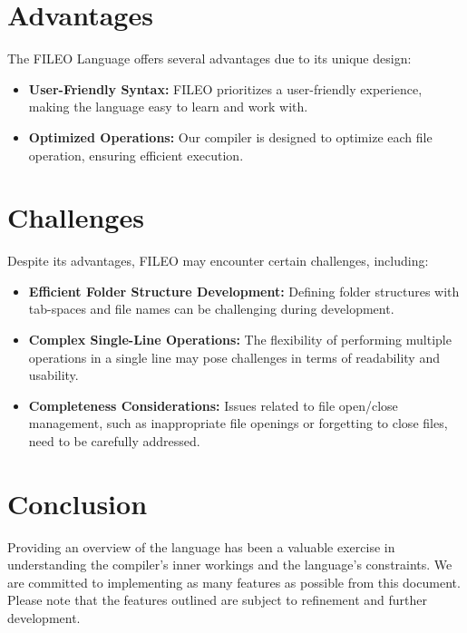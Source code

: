 \documentclass{article}
\begin{document}
\section{Advantages}
The FILEO Language offers several advantages due to its unique design:

\begin{itemize}
    \item \textbf{User-Friendly Syntax:} FILEO prioritizes a user-friendly experience, making the language easy to learn and work with.

    \item \textbf{Optimized Operations:} Our compiler is designed to optimize each file operation, ensuring efficient execution.

\end{itemize}

\section{Challenges}
Despite its advantages, FILEO may encounter certain challenges, including:

\begin{itemize}
    \item \textbf{Efficient Folder Structure Development:} Defining folder structures with tab-spaces and file names can be challenging during development.

    \item \textbf{Complex Single-Line Operations:} The flexibility of performing multiple operations in a single line may pose challenges in terms of readability and usability.

    \item \textbf{Completeness Considerations:} Issues related to file open/close management, such as inappropriate file openings or forgetting to close files, need to be carefully addressed.

\end{itemize}

\section{Conclusion}
Providing an overview of the language has been a valuable exercise in understanding the compiler's inner workings and the language's constraints. We are committed to implementing as many features as possible from this document. Please note that the features outlined are subject to refinement and further development.
\end{document}
